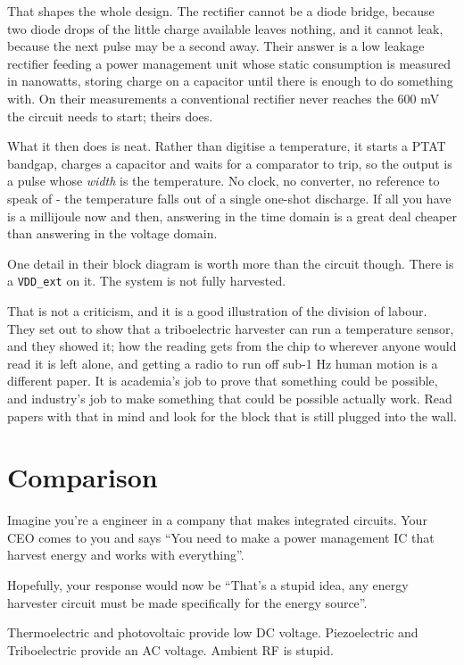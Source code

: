 That shapes the whole design. The rectifier cannot be a diode bridge,
because two diode drops of the little charge available leaves nothing,
and it cannot leak, because the next pulse may be a second away. Their
answer is a low leakage rectifier feeding a power management unit whose
static consumption is measured in nanowatts, storing charge on a
capacitor until there is enough to do something with. On their
measurements a conventional rectifier never reaches the 600 mV the
circuit needs to start; theirs does.

What it then does is neat. Rather than digitise a temperature, it starts
a PTAT bandgap, charges a capacitor and waits for a comparator to trip,
so the output is a pulse whose \emph{width} is the temperature. No
clock, no converter, no reference to speak of - the temperature falls
out of a single one-shot discharge. If all you have is a millijoule now
and then, answering in the time domain is a great deal cheaper than
answering in the voltage domain.

One detail in their block diagram is worth more than the circuit though.
There is a \texttt{VDD\_ext} on it. The system is not fully harvested.

That is not a criticism, and it is a good illustration of the division
of labour. They set out to show that a triboelectric harvester can run a
temperature sensor, and they showed it; how the reading gets from the
chip to wherever anyone would read it is left alone, and getting a radio
to run off sub-1 Hz human motion is a different paper. It is academia's
job to prove that something could be possible, and industry's job to
make something that could be possible actually work. Read papers with
that in mind and look for the block that is still plugged into the wall.

\section{Comparison}\label{comparison}

Imagine you're a engineer in a company that makes integrated circuits.
Your CEO comes to you and says ``You need to make a power management IC
that harvest energy and works with everything''.

Hopefully, your response would now be ``That's a stupid idea, any energy
harvester circuit must be made specifically for the energy source''.

Thermoelectric and photovoltaic provide low DC voltage. Piezoelectric
and Triboelectric provide an AC voltage. Ambient RF is stupid.

